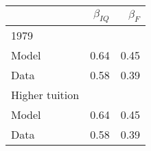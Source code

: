\begin{tabular}{lrr}
\hline
  & $\beta_{IQ}$  & $\beta_{F}$  \\ 
\hline
1979 &   &   \\ 
Model & 0.64  & 0.45  \\ 
Data & 0.58  & 0.39  \\ 
Higher tuition &   &   \\ 
Model & 0.64  & 0.45  \\ 
Data & 0.58  & 0.39  \\ 
\hline
\end{tabular}%
